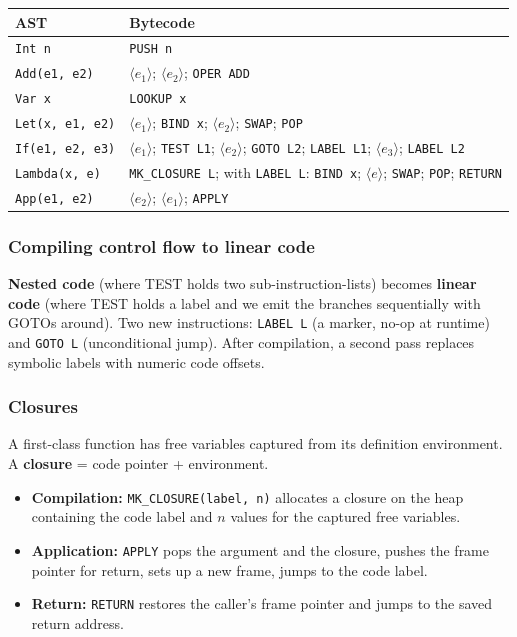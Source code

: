 \documentclass[11pt,a4paper]{article}
\begin{document}
\begin{center}
\begin{tabular}{ll}
\hline
\textbf{AST} & \textbf{Bytecode} \\
\hline
\texttt{Int n}            & \texttt{PUSH n} \\
\texttt{Add(e1, e2)}      & $\langle e_1 \rangle$; $\langle e_2 \rangle$; \texttt{OPER ADD} \\
\texttt{Var x}            & \texttt{LOOKUP x} \\
\texttt{Let(x, e1, e2)}   & $\langle e_1 \rangle$; \texttt{BIND x}; $\langle e_2 \rangle$; \texttt{SWAP}; \texttt{POP} \\
\texttt{If(e1, e2, e3)}   & $\langle e_1 \rangle$; \texttt{TEST L1}; $\langle e_2 \rangle$; \texttt{GOTO L2}; \texttt{LABEL L1}; $\langle e_3 \rangle$; \texttt{LABEL L2} \\
\texttt{Lambda(x, e)}     & \texttt{MK\_CLOSURE L}; \quad with \texttt{LABEL L}: \texttt{BIND x}; $\langle e \rangle$; \texttt{SWAP}; \texttt{POP}; \texttt{RETURN} \\
\texttt{App(e1, e2)}      & $\langle e_2 \rangle$; $\langle e_1 \rangle$; \texttt{APPLY} \\
\hline
\end{tabular}
\end{center}

\subsubsection*{Compiling control flow to linear code}

\textbf{Nested code} (where TEST holds two sub-instruction-lists) becomes \textbf{linear code} (where TEST holds a label and we emit the branches sequentially with GOTOs around). Two new instructions: \texttt{LABEL L} (a marker, no-op at runtime) and \texttt{GOTO L} (unconditional jump). After compilation, a second pass replaces symbolic labels with numeric code offsets.

\subsubsection*{Closures}

A first-class function has free variables captured from its definition environment. A \textbf{closure} = code pointer + environment.

\begin{itemize}[leftmargin=*,itemsep=0pt]
  \item \textbf{Compilation:} \verb|MK_CLOSURE(label, n)| allocates a closure on the heap containing the code label and $n$ values for the captured free variables.
  \item \textbf{Application:} \verb|APPLY| pops the argument and the closure, pushes the frame pointer for return, sets up a new frame, jumps to the code label.
  \item \textbf{Return:} \verb|RETURN| restores the caller's frame pointer and jumps to the saved return address.
\end{itemize}
\end{document}
